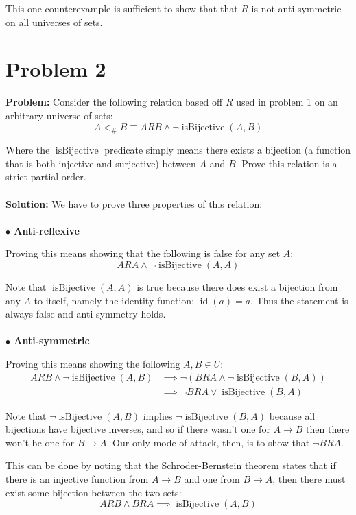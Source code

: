 \documentclass{article}
\begin{document}
This one counterexample is sufficient to show that that $R$ is not anti-symmetric on all universes of sets.

\section*{Problem 2}
\textbf{Problem:} Consider the following relation based off $R$ used in problem 1 on an arbitrary universe of sets:
$$A<_\# B\equiv ARB\wedge\neg\operatorname{isBijective}(A,B)$$

Where the $\operatorname{isBijective}$ predicate simply means there exists a bijection (a function that is both injective and surjective) between $A$ and $B$. Prove this relation is a strict partial order.
\\\\
\textbf{Solution:} We have to prove three properties of this relation:
\\\\
\textbf{$\bullet$ Anti-reflexive}

Proving this means showing that the following is false for any set $A$:
$$ARA \wedge \neg\operatorname{isBijective}(A,A)$$

Note that $\operatorname{isBijective}(A,A)$ is true because there does exist a bijection from any $A$ to itself, namely the identity function: $\operatorname{id}(a)=a$. Thus the statement is always false and anti-symmetry holds.
\\\\
\textbf{$\bullet$ Anti-symmetric}

Proving this means showing the following $A,B\in U$:
\begin{align*}
  ARB\wedge\neg\operatorname{isBijective}(A,B)&\implies\neg( BRA\wedge\neg\operatorname{isBijective}(B,A))\\
  &\implies \neg BRA\vee\operatorname{isBijective}(B,A)
\end{align*}

Note that $\neg\operatorname{isBijective}(A,B)$ implies $\neg\operatorname{isBijective}(B,A)$ because all bijections have bijective inverses, and so if there wasn't one for $A\to B$ then there won't be one for $B\to A$. Our only mode of attack, then, is to show that $\neg BRA$.

This can be done by noting that the Schroder-Bernstein theorem states that if there is an injective function from $A\to B$ and one from $B\to A$, then there must exist some bijection between the two sets:
$$ARB\wedge BRA\implies \operatorname{isBijective}(A,B)$$
\end{document}
